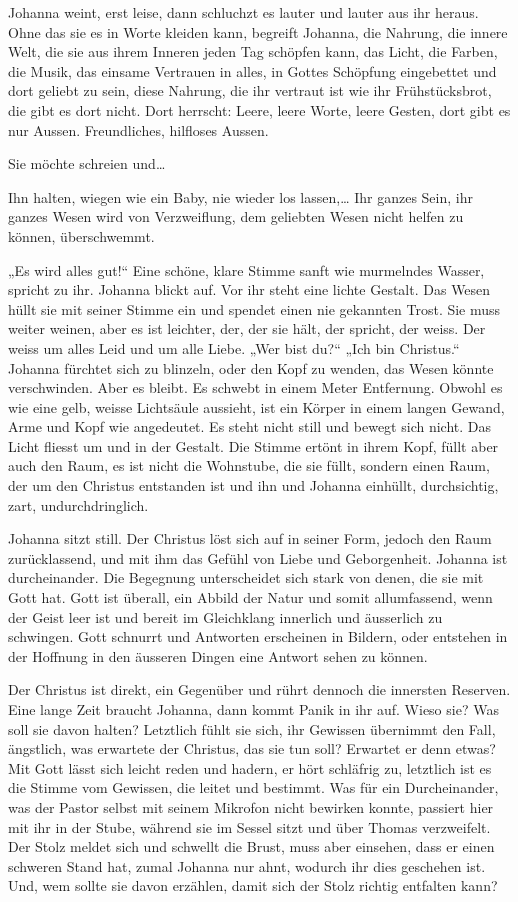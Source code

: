 \documentclass[10pt,a5paper]{book}
\begin{document}
Johanna weint, erst leise, dann schluchzt es lauter und lauter aus ihr heraus. Ohne das sie es in Worte kleiden kann, begreift Johanna, die Nahrung, die innere Welt, die sie aus ihrem Inneren jeden Tag schöpfen kann, das Licht, die Farben, die Musik, das einsame Vertrauen in alles, in Gottes Schöpfung eingebettet und dort geliebt zu sein, diese Nahrung, die ihr vertraut ist wie ihr Frühstücksbrot, die gibt es dort nicht. Dort herrscht: Leere, leere Worte, leere Gesten, dort gibt es nur Aussen. Freundliches, hilfloses Aussen.

Sie möchte schreien und\dots 

Ihn halten, wiegen wie ein Baby, nie wieder los lassen,\dots 
Ihr ganzes Sein, ihr ganzes Wesen wird von Verzweiflung, dem geliebten Wesen nicht helfen zu können, überschwemmt.

„Es wird alles gut!“ Eine schöne, klare Stimme sanft wie murmelndes Wasser, spricht zu ihr. Johanna blickt auf. Vor ihr steht eine lichte Gestalt. Das Wesen hüllt sie mit seiner Stimme ein und spendet einen nie gekannten Trost. Sie muss weiter weinen, aber es ist leichter, der, der sie hält, der spricht, der weiss. Der weiss um alles Leid und um alle Liebe. „Wer bist du?“ „Ich bin Christus.“ Johanna fürchtet sich zu blinzeln, oder den Kopf zu wenden, das Wesen könnte verschwinden. Aber es bleibt. Es schwebt in einem Meter Entfernung. Obwohl es wie eine gelb, weisse Lichtsäule aussieht, ist ein Körper in einem langen Gewand, Arme und Kopf wie angedeutet.  Es steht nicht still und bewegt sich nicht. Das Licht fliesst um und in der Gestalt. Die Stimme ertönt in ihrem Kopf, füllt aber auch den Raum, es ist nicht die Wohnstube, die sie füllt, sondern einen Raum, der um den Christus entstanden ist und ihn und Johanna einhüllt, durchsichtig, zart, undurchdringlich.

Johanna sitzt still. Der Christus löst sich auf in seiner Form, jedoch den Raum zurücklassend, und mit ihm das Gefühl von Liebe und Geborgenheit. 
Johanna ist durcheinander. Die Begegnung unterscheidet sich stark von denen, die sie mit Gott hat. Gott ist überall, ein Abbild der Natur und somit allumfassend, wenn der Geist leer ist und bereit im Gleichklang innerlich und äusserlich zu schwingen. Gott schnurrt und Antworten erscheinen in Bildern, oder entstehen in der Hoffnung in den äusseren Dingen eine Antwort sehen zu können.

Der Christus ist direkt, ein Gegenüber und rührt dennoch die innersten Reserven. Eine lange Zeit braucht Johanna, dann kommt Panik in ihr auf. Wieso sie? Was soll sie davon halten? Letztlich fühlt sie sich, ihr Gewissen übernimmt den Fall, ängstlich, was erwartete der Christus, das sie tun soll? Erwartet er denn etwas? Mit Gott lässt sich leicht reden und hadern, er hört schläfrig zu, letztlich ist es die Stimme vom Gewissen, die leitet und bestimmt. Was für ein Durcheinander, was der Pastor selbst mit seinem Mikrofon nicht bewirken konnte, passiert hier mit ihr in der Stube, während sie im Sessel sitzt und über Thomas verzweifelt. Der Stolz meldet sich und schwellt die Brust, muss aber einsehen, dass er einen schweren Stand hat, zumal Johanna nur ahnt, wodurch ihr dies geschehen ist. Und, wem sollte sie davon erzählen, damit sich der Stolz richtig entfalten kann?
\end{document}
